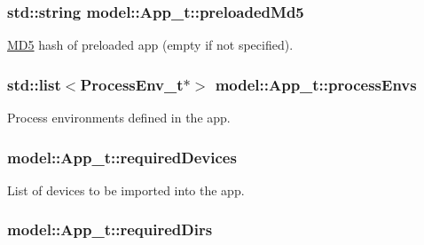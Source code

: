 \subsubsection[{\texorpdfstring{preloaded\+Md5}{preloadedMd5}}]{\setlength{\rightskip}{0pt plus 5cm}std\+::string model\+::\+App\+\_\+t\+::preloaded\+Md5}\hypertarget{structmodel_1_1_app__t_a6f89e232c59fe6f32bb8c7d68047ee00}{}\label{structmodel_1_1_app__t_a6f89e232c59fe6f32bb8c7d68047ee00}


\hyperlink{class_m_d5}{M\+D5} hash of preloaded app (empty if not specified). 

\subsubsection[{\texorpdfstring{process\+Envs}{processEnvs}}]{\setlength{\rightskip}{0pt plus 5cm}std\+::list$<${\bf Process\+Env\+\_\+t}$\ast$$>$ model\+::\+App\+\_\+t\+::process\+Envs}\hypertarget{structmodel_1_1_app__t_a51f2a8eb6b993bb24e9c871ea5f5666f}{}\label{structmodel_1_1_app__t_a51f2a8eb6b993bb24e9c871ea5f5666f}


Process environments defined in the app. 

\subsubsection[{\texorpdfstring{required\+Devices}{requiredDevices}}]{ model\+::\+App\+\_\+t\+::required\+Devices}\hypertarget{structmodel_1_1_app__t_a9c35aba02b2f04bfeb8f4a2c72ebaf62}{}\label{structmodel_1_1_app__t_a9c35aba02b2f04bfeb8f4a2c72ebaf62}


List of devices to be imported into the app. 

\subsubsection[{\texorpdfstring{required\+Dirs}{requiredDirs}}]{ model\+::\+App\+\_\+t\+::required\+Dirs}\hypertarget{structmodel_1_1_app__t_a854759e1cb4b127d579513c0d8b1702c}{}\label{structmodel_1_1_app__t_a854759e1cb4b127d579513c0d8b1702c}


